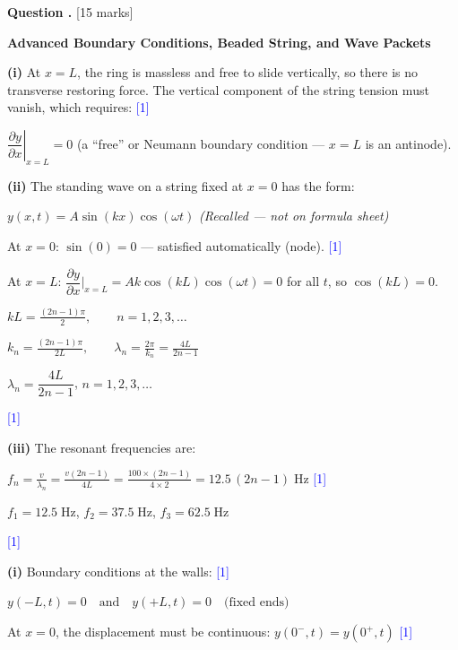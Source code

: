 \documentclass[12pt,a4paper]{article}
\newcounter{questioncounter}
\newcommand{\question}[1]{%
  \stepcounter{questioncounter}%
  \vspace{0.5cm}%
  \noindent\textbf{Question \thequestioncounter.} \hfill [#1 marks]%
  \vspace{0.2cm}%
  \par%
}
\newcommand{\markstep}[1]{\hfill\textcolor{blue}{[#1]}}
\newcommand{\finalanswer}[1]{%
  \begin{tcolorbox}[colback=green!5!white,colframe=green!50!black,boxrule=0.5pt]
  #1
  \end{tcolorbox}
}
\newcommand{\recalled}{\textit{(Recalled --- not on formula sheet)}}
\begin{document}
\newpage

\question{15}

\noindent\textbf{Advanced Boundary Conditions, Beaded String, and Wave Packets}

\begin{parts}

\item

\textbf{(i)} At $x = L$, the ring is massless and free to slide vertically, so there is no transverse restoring force. The vertical component of the string tension must vanish, which requires: \markstep{1}

\finalanswer{$\left.\dfrac{\partial y}{\partial x}\right|_{x=L} = 0$ \quad (a ``free'' or Neumann boundary condition --- $x = L$ is an antinode).}

\textbf{(ii)} The standing wave on a string fixed at $x = 0$ has the form:

$y(x,t) = A\sin(kx)\cos(\omega t)$ \recalled

At $x = 0$: $\sin(0) = 0$ --- satisfied automatically (node). \markstep{1}

At $x = L$: $\dfrac{\partial y}{\partial x}\Big|_{x=L} = Ak\cos(kL)\cos(\omega t) = 0$ for all $t$, so $\cos(kL) = 0$.

$kL = \frac{(2n-1)\pi}{2}, \qquad n = 1, 2, 3, \ldots$

$k_n = \frac{(2n-1)\pi}{2L}, \qquad \lambda_n = \frac{2\pi}{k_n} = \frac{4L}{2n-1}$

\finalanswer{$\lambda_n = \dfrac{4L}{2n-1}$, \quad $n = 1, 2, 3, \ldots$} \markstep{1}

\textbf{(iii)} The resonant frequencies are:

$f_n = \frac{v}{\lambda_n} = \frac{v(2n-1)}{4L} = \frac{100\times(2n-1)}{4\times 2} = 12.5\,(2n-1)\;\text{Hz}$ \markstep{1}

\finalanswer{$f_1 = 12.5\;\text{Hz}$, \quad $f_2 = 37.5\;\text{Hz}$, \quad $f_3 = 62.5\;\text{Hz}$} \markstep{1}

\item

\textbf{(i)} Boundary conditions at the walls: \markstep{1}

$y(-L,t) = 0 \quad\text{and}\quad y(+L,t) = 0 \quad\text{(fixed ends)}$

At $x = 0$, the displacement must be continuous: $y(0^-,t) = y(0^+,t)$ \markstep{1}


\end{parts}
\end{document}
